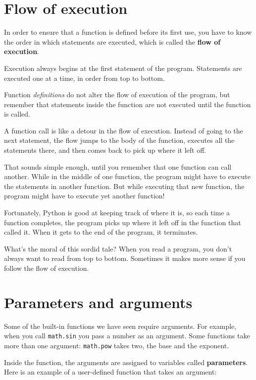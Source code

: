 \documentclass[10pt]{book}
\begin{document}
\section{Flow of execution}

In order to ensure that a function is defined before its first use,
you have to know the order in which statements are executed, which is
called the {\bf flow of execution}.

Execution always begins at the first statement of the program.
Statements are executed one at a time, in order from top to bottom.

Function \emph{definitions} do not alter the flow of execution of the
program, but remember that statements inside the function are not
executed until the function is called.

A function call is like a detour in the flow of execution. Instead of
going to the next statement, the flow jumps to the body of
the function, executes all the statements there, and then comes back
to pick up where it left off.

That sounds simple enough, until you remember that one function can
call another.  While in the middle of one function, the program might
have to execute the statements in another function. But while
executing that new function, the program might have to execute yet
another function!

Fortunately, Python is good at keeping track of where it is, so each
time a function completes, the program picks up where it left off in
the function that called it.  When it gets to the end of the program,
it terminates.

What's the moral of this sordid tale?  When you read a program, you
don't always want to read from top to bottom.  Sometimes it makes
more sense if you follow the flow of execution.


\section{Parameters and arguments}
\label{parameters}

Some of the built-in functions we have seen require arguments.  For
example, when you call {\tt math.sin} you pass a number
as an argument.  Some functions take more than one argument:
{\tt math.pow} takes two, the base and the exponent.

Inside the function, the arguments are assigned to
variables called {\bf parameters}.  Here is an example of a
user-defined function that takes an argument:
\end{document}
